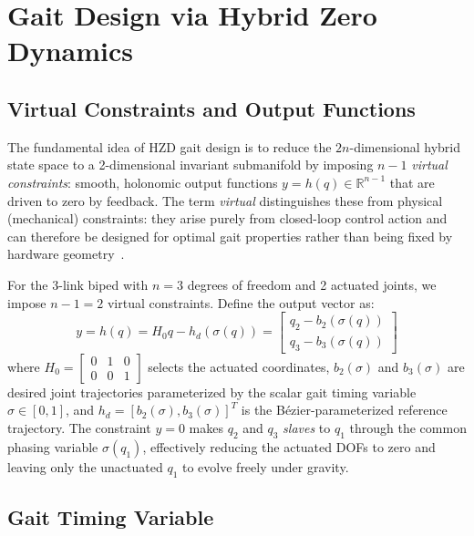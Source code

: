 \documentclass[conference]{IEEEtran}
\begin{document}
\section{Gait Design via Hybrid Zero Dynamics} \label{sec:gait}

\subsection{Virtual Constraints and Output Functions}

The fundamental idea of HZD gait design is to reduce the $2n$-dimensional hybrid state space to a 2-dimensional invariant submanifold by imposing $n-1$ \emph{virtual constraints}: smooth, holonomic output functions $y = h(q) \in \mathbb{R}^{n-1}$ that are driven to zero by feedback. The term \emph{virtual} distinguishes these from physical (mechanical) constraints: they arise purely from closed-loop control action and can therefore be designed for optimal gait properties rather than being fixed by hardware geometry~\cite{westervelt}.

For the 3-link biped with $n=3$ degrees of freedom and 2 actuated joints, we impose $n-1 = 2$ virtual constraints. Define the output vector as:
\begin{equation}
    y = h(q) = H_0 q - h_d(\sigma(q)) = \begin{bmatrix} q_2 - b_2(\sigma(q)) \\ q_3 - b_3(\sigma(q)) \end{bmatrix} \label{eq:output}
\end{equation}
where $H_0 = \begin{bmatrix}0&1&0\\0&0&1\end{bmatrix}$ selects the actuated coordinates, $b_2(\sigma)$ and $b_3(\sigma)$ are desired joint trajectories parameterized by the scalar gait timing variable $\sigma \in [0,1]$, and $h_d = [b_2(\sigma), b_3(\sigma)]^T$ is the B\'ezier-parameterized reference trajectory. The constraint $y = 0$ makes $q_2$ and $q_3$ \emph{slaves} to $q_1$ through the common phasing variable $\sigma(q_1)$, effectively reducing the actuated DOFs to zero and leaving only the unactuated $q_1$ to evolve freely under gravity.

\subsection{Gait Timing Variable}
\end{document}
